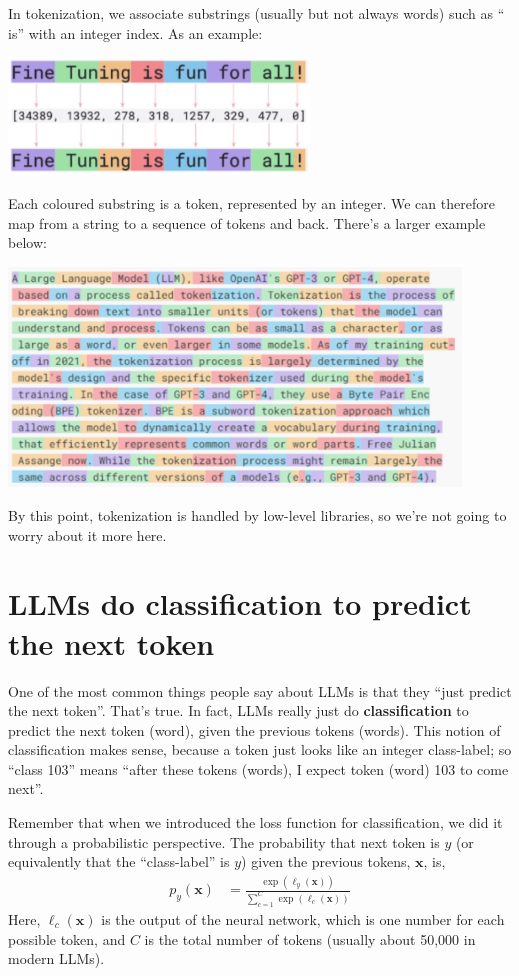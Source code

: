 \documentclass{article}
\newcommand{\x}{\mathbf{x}}
\newcommand{\logits}{\ell}
\newcommand{\bracket}[3]{\left#1 #3 \right#2}
\renewcommand{\b}{\bracket{(}{)}}
\begin{document}
In tokenization, we associate substrings (usually but not always words) such as `` is'' with an integer index.
As an example:
\begin{center}
  \includegraphics[width=0.6\textwidth]{token_small.png}
\end{center}
Each coloured substring is a token, represented by an integer.
We can therefore map from a string to a sequence of tokens and back.
There's a larger example below:
\begin{center}
  \includegraphics[width=0.9\textwidth]{token_big.png}
\end{center}
By this point, tokenization is handled by low-level libraries, so we're not going to worry about it more here.

\section{LLMs do classification to predict the next token}

One of the most common things people say about LLMs is that they ``just predict the next token''.
That's true.
In fact, LLMs really just do \textbf{classification} to predict the next token (word), given the previous tokens (words).
This notion of classification makes sense, because a token just looks like an integer class-label; so ``class 103'' means ``after these tokens (words), I expect token (word) 103 to come next''.

Remember that when we introduced the loss function for classification, we did it through a probabilistic perspective.
The probability that next token is $y$ (or equivalently that the ``class-label'' is $y$) given the previous tokens, $\x$, is,
\begin{align}
  p_y(\x) &= \frac{\exp\b{\logits_y(\x)}}{\sum_{c=1}^C \exp\b{\logits_c(\x)}}
\end{align}
Here, $\logits_c(\x)$ is the output of the neural network, which is one number for each possible token, and $C$ is the total number of tokens (usually about 50,000 in modern LLMs).
\end{document}
